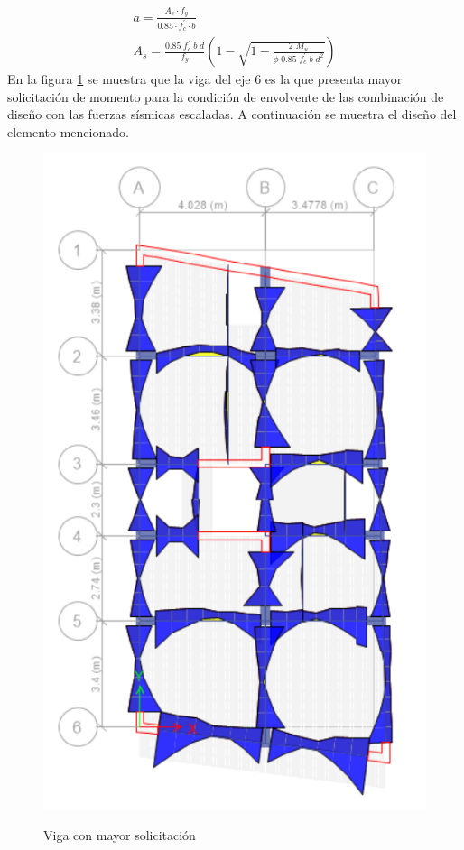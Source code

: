 \begin{gather}
a=\frac{A_{s}\cdot f_{y}}{0.85\cdot f_{c}^{'}\cdot b}\label{16}\\
A_{s}=\frac{0.85\;f_{c}^{'}\;b\;d}{f_{y}}\left ( 1-\sqrt{1-\frac{2\;M_{u}}{\phi\;0.85\;f_{c}^{'}\;b\;d^{2} }} \right )
\label{ace}
\end{gather}
\newpage
\noindent En la figura \ref{vigm} se muestra que la viga del eje 6 es la que presenta mayor solicitación de momento para la condición de envolvente de las combinación de diseño con las fuerzas sísmicas escaladas. A continuación se muestra el diseño del elemento mencionado.
\begin{figure}[h!]
    \centering
    \caption{Viga con mayor solicitación}
    \includegraphics[scale=0.8]{IMAGENES/d10.PNG}
    \label{vigm}
\end{figure}

